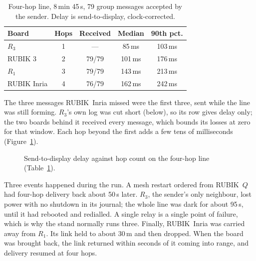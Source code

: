 \documentclass[conference,10pt]{IEEEtran}
\begin{document}
\begin{table}[t]
\centering
\caption{Four-hop line, 8\,min 45\,s, 79 group messages accepted by the
sender. Delay is send-to-display, clock-corrected.}
\label{tab:line}
\begin{tabular}{@{}lcccc@{}}
\toprule
Board & Hops & Received & Median & 90th pct. \\
\midrule
$R_3$ & 1 & --- & 85\,ms & 103\,ms \\
RUBIK 3 & 2 & 79/79 & 101\,ms & 176\,ms \\
$R_1$ & 3 & 79/79 & 143\,ms & 213\,ms \\
RUBIK Inria & 4 & 76/79 & 162\,ms & 242\,ms \\
\bottomrule
\end{tabular}
\end{table}

The three messages RUBIK~Inria missed were the first three, sent while
the line was still forming. $R_3$'s own log was cut short (below), so its
row gives delay only; the two boards behind it received every message,
which bounds its losses at zero for that window. Each hop beyond the
first adds a few tens of milliseconds (Figure~\ref{fig:hops}).

\begin{figure}[t]
\centering
{}
\caption{Send-to-display delay against hop count on the four-hop line
(Table~\ref{tab:line}).}
\label{fig:hops}
\end{figure}

Three events happened during the run. A mesh restart ordered from
RUBIK~$Q$ had four-hop delivery back about 50\,s later. $R_3$, the
sender's only neighbour, lost power with no shutdown in its journal; the
whole line was dark for about 95\,s, until it had rebooted and redialled.
A single relay is a single point of failure, which is why the stand
normally runs three. Finally, RUBIK~Inria was carried away from $R_1$. Its
link held to about 30\,m and then dropped. When the board was brought
back, the link returned within seconds of it coming into range, and
delivery resumed at four hops.
\end{document}
